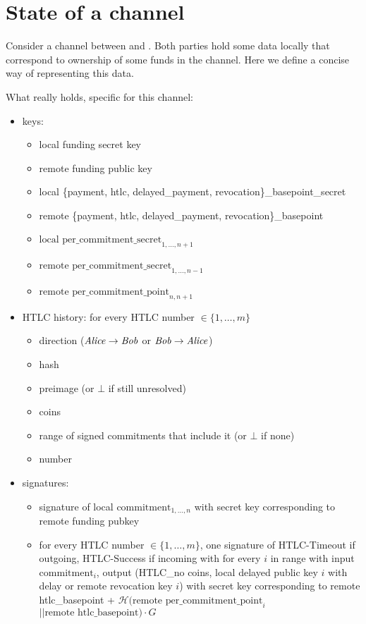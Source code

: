 \section{State of a channel}
  Consider a channel between \alice{} and \bob. Both parties hold some data
  locally that correspond to ownership of some funds in the channel. Here we
  define a concise way of representing this data.

  What \alice{} really holds, specific for this channel:
  \begin{itemize}
    \item keys:
    \begin{itemize}
      \item local funding secret key
      \item remote funding public key
      \item local \{payment, htlc, delayed\_payment,
      revocation\}\_basepoint\_secret
      \item remote \{payment, htlc, delayed\_payment, revocation\}\_basepoint
      \item $\text{local per\_commitment\_secret}_{1, \dots, n+1}$
      \item $\text{remote per\_commitment\_secret}_{1, \dots, n-1}$
      \item $\text{remote per\_commitment\_point}_{n, n+1}$
    \end{itemize}
    \item HTLC history: for every HTLC number $\in \{1, \dots, m\}$
      \begin{itemize}
        \item direction ($\mathit{Alice}{} \rightarrow \mathit{Bob}$ or $\mathit{Bob}{} \rightarrow
        \mathit{Alice}$)
        \item hash
        \item preimage (or $\bot$ if still unresolved)
        \item coins
        \item range of signed commitments that include it (or $\bot$ if none)
        \item number
      \end{itemize}
    \item signatures:
    \begin{itemize}
      \item signature of local $\mathrm{commitment}_{1, \dots, n}$ with secret
      key corresponding to remote funding pubkey
      \item for every HTLC number $\in \{1, \dots, m\}$, one signature of
      HTLC-Timeout if outgoing, HTLC-Success if incoming with for every $i$ in
      range with input $\mathrm{commitment}_i$, output (HTLC\_no coins, local
      delayed public key $i$ with delay or remote revocation key $i$) with
      secret key corresponding to remote htlc\_basepoint +
      $\mathcal{H}(\text{remote per\_commitment\_point}_i$ $|| \text{remote
      htlc\_basepoint}) \cdot G$
    \end{itemize}
  \end{itemize}
